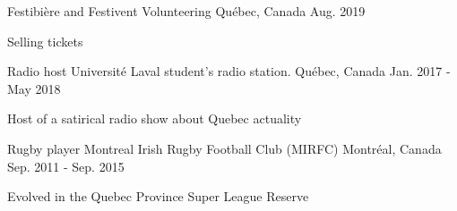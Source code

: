 


\begin{cventries}

\cventry
{Festibière and Festivent} %
{Volunteering} %
{Québec, Canada} %
{Aug. 2019} %
{ %
\begin{cvitems}
\item {Selling tickets}
\end{cvitems}
}


\cventry
{Radio host} %
{Université Laval student's radio station.} %
{Québec, Canada} %
{Jan. 2017 - May 2018} %
{ %
\begin{cvitems}
\item {Host of a satirical radio show about Quebec actuality}
\end{cvitems}
}


\cventry
{Rugby player} %
{Montreal Irish Rugby Football Club (MIRFC)} %
{Montréal, Canada} %
{Sep. 2011 - Sep. 2015} %
{ %
\begin{cvitems}
\item {Evolved in the Quebec Province Super League Reserve}
\end{cvitems}
}



\end{cventries}
